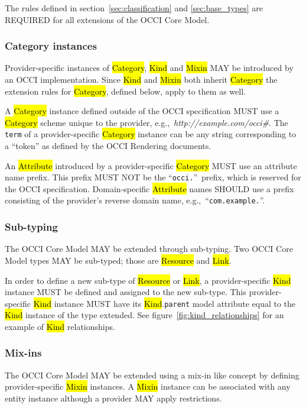 \documentclass[10pt,a4paper]{article}
\begin{document}
The rules defined in section~\ref{sec:classification} and
\ref{sec:base_types} are REQUIRED for all extensions of the OCCI Core
Model.

\subsubsection{Category instances}
\label{sec:ext:category}
Provider-specific instances of \hl{Category}, \hl{Kind} and \hl{Mixin}
MAY be introduced by an OCCI implementation. Since \hl{Kind} and
\hl{Mixin} both inherit \hl{Category} the extension rules for
\hl{Category}, defined below, apply to them as well.

A \hl{Category} instance defined outside of the OCCI specification
MUST use a \hl{Category} scheme unique to the provider,
e.g.,~\textit{http://example.com/occi\#}. The {\tt term} of a
provider-specific \hl{Category} instance can be any string
corresponding to a ``token'' as defined by the OCCI Rendering documents.

An \hl{Attribute} introduced by a provider-specific \hl{Category} MUST use
an attribute name prefix. This prefix MUST NOT be the
``\texttt{occi.}''~prefix, which is reserved for the OCCI
specification. Domain-specific \hl{Attribute} names SHOULD use a prefix
consisting of the provider's reverse domain name,
e.g.,~``\texttt{com.example.}''.

\subsubsection{Sub-typing}
The OCCI Core Model MAY be extended through sub-typing.  Two OCCI
Core Model types MAY be sub-typed; those are \hl{Resource} and \hl{Link}.

In order to define a new sub-type of \hl{Resource} or \hl{Link}, a
provider-specific \hl{Kind} instance MUST be defined and assigned to
the new sub-type.
This provider-specific \hl{Kind} instance MUST have its \hl{Kind}.{\tt parent}
model attribute equal to the \hl{Kind} instance of the type extended.
See figure~\ref{fig:kind_relationships} for an example of \hl{Kind}
relationships.

\subsubsection{Mix-ins}
The OCCI Core Model MAY be extended using a mix-in like concept by
defining provider-specific \hl{Mixin} instances.  A \hl{Mixin}
instance can be associated with any entity instance although a
provider MAY apply restrictions.
\end{document}
